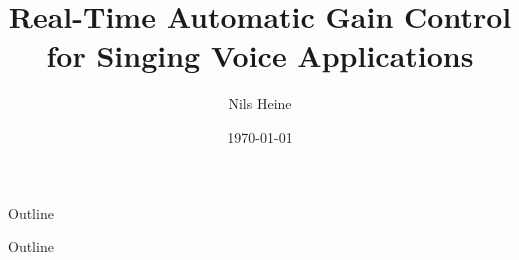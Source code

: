 \documentclass[10pt]{beamer}
\title[This is the short title]{Real-Time Automatic Gain Control for Singing Voice Applications}
\author[Short Name]{Nils Heine}
\institute[Uni Hamburg]{University of Hamburg\\ Department of Informatics}
\date{\today}
\begin{document}
\begin{frame}[plain]
    \maketitle
\end{frame}

\begin{frame}{Outline}
    \tableofcontents
\end{frame}












%

%

%

%

%

%

\begin{frame}{Outline}
    \tableofcontents
\end{frame}
\end{document}
